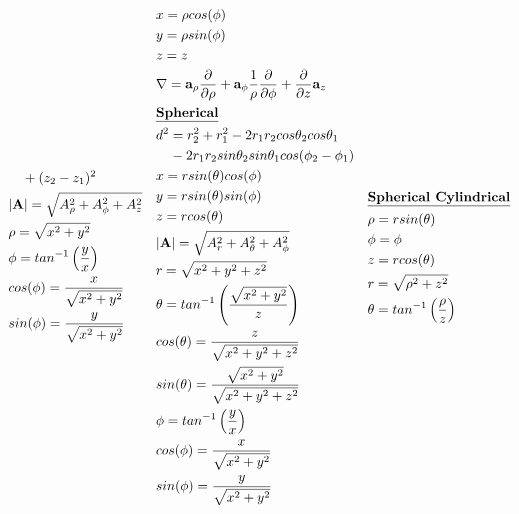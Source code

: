 \documentclass[10pt,letterpaper]{report}
\begin{document}
\begin{equation*}
\begin{split}
      &\quad + (z_2 - z_1)^2 \\
      &\lvert\textbf{A} \rvert = \sqrt{A_{\rho}^2 + A_{\phi}^2 + A_z^2} \\ %
      &\rho = \sqrt{x^2 + y^2} \\
      &\phi = tan^{-1} \left(\frac{y}{x}\right) \\
      &cos( \phi ) = \frac{x}{\sqrt{x^2 + y^2}} \\
      &sin( \phi ) = \frac{y}{\sqrt{x^2 + y^2}}
    \end{split}
    \quad
    \begin{split} %
      &x = \rho cos(\phi) \\
      &y = \rho sin(\phi) \\
      &z = z \\
      &\nabla = \textbf{a}_{\rho} \frac{\partial}{\partial \rho} + \textbf{a}_{\phi} \frac{1}{\rho} \frac{\partial}{\partial \phi} + \frac{\partial}{\partial z}\textbf{a}_z \\
      &\text{\underline{\textbf{Spherical}}} \\
      &d^2 = r_2^2 + r_1^2 -2r_1r_2 cos \theta_2 cos \theta_1 \\ %
      &\quad -2r_1r_2 sin \theta_2 sin \theta_1 cos( \phi_2 - \phi_1 ) \\
      &x = r sin( \theta ) cos( \phi ) \\
      &y = r sin( \theta ) sin( \phi ) \\
      &z = r cos( \theta ) \\
      &\lvert \textbf{A} \rvert = \sqrt{A_{r}^2 + A_{\theta}^2 + A_{\phi}^2} \\ %
      &r = \sqrt{x^2 + y^2 +z^2} \\
      &\theta = tan^{-1} \left(\frac{\sqrt{x^2 + y^2}}{z}\right) \\
      &cos( \theta ) = \frac{z}{\sqrt{x^2 + y^2 +z^2}} \\
      &sin( \theta ) = \frac{\sqrt{x^2 + y^2}}{\sqrt{x^2 + y^2 +z^2}}\\
      &\phi = tan^{-1} \left(\frac{y}{x}\right) \\
      &cos( \phi ) = \frac{x}{\sqrt{x^2 + y^2}} \\
      &sin( \phi ) = \frac{y}{\sqrt{x^2 + y^2}} \\
    \end{split}
    \quad  
    \begin{split} %
    &\text{\underline{\textbf{Spherical Cylindrical}}} \\
    &\rho = r sin( \theta ) \\
    &\phi = \phi \\
    &z = r cos( \theta ) \\
    &r = \sqrt{\rho^2 + z^2} \\
    &\theta = tan^{-1} \left(\frac{\rho}{z}\right)
    \end{split}
  \end{equation*}
  
\end{document}
